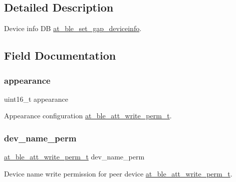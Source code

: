 \subsection{Detailed Description}
Device info DB \mbox{\hyperlink{group__gap__dev__config__group_gaed47ccba87a2a4989e49243c5de5a767}{at\+\_\+ble\+\_\+set\+\_\+gap\+\_\+deviceinfo}}. 

\subsection{Field Documentation}
\mbox{\label{structat__ble__gap__deviceinfo__t_aae507e6864c05476c851ba7548517a3c}} 
\subsubsection{\texorpdfstring{appearance}{appearance}}
{\footnotesize\ttfamily uint16\+\_\+t appearance}



Appearance configuration \mbox{\hyperlink{at__ble__api_8h_acd9a0371335811dbc90e98a7802a8968}{at\+\_\+ble\+\_\+att\+\_\+write\+\_\+perm\+\_\+t}}. 

\mbox{\label{structat__ble__gap__deviceinfo__t_a68f6957b4c43ca820e048dd644735288}} 
\subsubsection{\texorpdfstring{dev\_name\_perm}{dev\_name\_perm}}
{\footnotesize\ttfamily \mbox{\hyperlink{at__ble__api_8h_acd9a0371335811dbc90e98a7802a8968}{at\+\_\+ble\+\_\+att\+\_\+write\+\_\+perm\+\_\+t}} dev\+\_\+name\+\_\+perm}



Device name write permission for peer device \mbox{\hyperlink{at__ble__api_8h_acd9a0371335811dbc90e98a7802a8968}{at\+\_\+ble\+\_\+att\+\_\+write\+\_\+perm\+\_\+t}}. 

\mbox{\label{structat__ble__gap__deviceinfo__t_a3f127c06ed9fc788bfcea253ab0b9d43}} 
